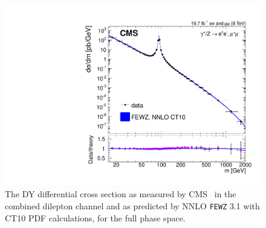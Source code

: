 \begin{figure}[p]
    \centering
    \includegraphics[height=0.3\textheight]{figures/ss-inclboson-drellyan-cms8tev}
    \caption{The DY differential cross section as measured by CMS~\cite{CMS:2014jea} in the combined
dilepton channel and as predicted by NNLO \texttt{FEWZ} 3.1 with CT10 PDF
calculations, for the full phase space.}
    \label{fig:ss-inclboson-drellyan-cms8tev}
\end{figure}
